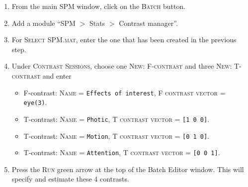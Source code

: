 \begin{enumerate}
 \item From the main SPM window, click on the \textsc{Batch} button.
 \item Add a module ``SPM $>$ Stats $>$ Contrast manager''.
 \item For \textsc{Select SPM.mat}, enter the one that has been created in the previous step.
 \item Under \textsc{Contrast Sessions}, choose one \textsc{New: F-contrast} and three \textsc{New: T-contrast} and enter
 \begin{itemize}
  \item F-contrast: \textsc{Name} = \texttt{Effects of interest}, \textsc{F contrast vector} = \texttt{eye(3)}.
  \item T-contrast: \textsc{Name} = \texttt{Photic}, \textsc{T contrast vector} = \texttt{[1 0 0]}.
  \item T-contrast: \textsc{Name} = \texttt{Motion}, \textsc{T contrast vector} = \texttt{[0 1 0]}.
  \item T-contrast: \textsc{Name} = \texttt{Attention}, \textsc{T contrast vector} = \texttt{[0 0 1]}.
 \end{itemize}
 \item Press the \textsc{Run} green arrow at the top of the Batch Editor window. This will specify and estimate these 4 contrasts.
\end{enumerate}

